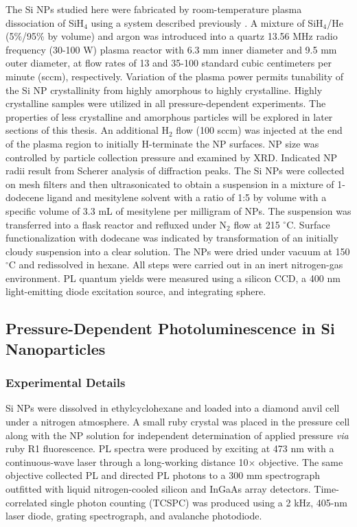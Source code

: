 The Si NPs studied here were fabricated by room-temperature plasma dissociation of SiH$_4$ using a system described previously \cite{mangolini2007plasma}. A mixture of SiH$_4$/He (5\%/95\% by volume) and argon was introduced into a quartz 13.56 MHz radio frequency (30-100 W) plasma reactor with 6.3 mm inner diameter and 9.5 mm outer diameter, at flow rates of 13 and 35-100 standard cubic centimeters per minute (sccm), respectively. Variation of the plasma power permits tunability of the Si NP crystallinity from highly amorphous to highly crystalline.  Highly crystalline samples were utilized in all pressure-dependent experiments.  The properties of less crystalline and amorphous particles will be explored in later sections of this thesis. An additional H$_2$ flow (100 sccm) was injected at the end of the plasma region to initially H-terminate the NP surfaces. NP size was controlled by particle collection pressure and examined by XRD. Indicated NP radii result from Scherer analysis of diffraction peaks. The Si NPs were collected on mesh filters and then ultrasonicated to obtain a suspension in a mixture of 1-dodecene ligand and mesitylene solvent with a ratio of 1:5 by volume with a specific volume of 3.3 mL of mesitylene per milligram of NPs. The suspension was transferred into a flask reactor and refluxed under N$_2$ flow at 215 $^{\circ}$C. Surface functionalization with dodecane was indicated by transformation of an initially cloudy suspension into a clear solution. The NPs were dried under vacuum at 150 $^{\circ}$C and redissolved in hexane. All steps were carried out in an inert nitrogen-gas environment. PL quantum yields were measured using a silicon CCD, a 400 nm light-emitting diode excitation source, and integrating sphere.

\subsection{Pressure-Dependent Photoluminescence in Si Nanoparticles}

\subsubsection{Experimental Details}
Si NPs were dissolved in ethylcyclohexane and loaded into a diamond anvil cell under a nitrogen atmosphere. A small ruby crystal was placed in the pressure cell along with the NP solution for independent determination of applied pressure \emph{via} ruby R1 fluorescence. PL spectra were produced by exciting at 473 nm with a continuous-wave laser through a long-working distance 10$\times$ objective. The same objective collected PL and directed PL photons to a 300 mm spectrograph outfitted with liquid nitrogen-cooled silicon and InGaAs array detectors. Time-correlated single photon counting (TCSPC) was produced using a 2 kHz, 405-nm laser diode, grating spectrograph, and avalanche photodiode.
